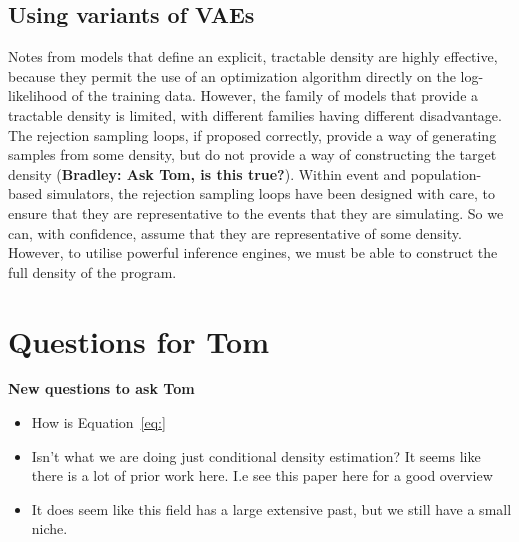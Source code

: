 \documentclass{article}
\begin{document}
\subsection{Using variants of VAEs}

Notes from models that define an explicit,  
tractable density are highly effective, 
because they permit the use of an optimization algorithm directly on the log-likelihood of the training data.
However,  the  family  of  models  that provide  a  tractable  density  is  limited,
with  different  families  having  different disadvantage.
The rejection sampling loops, if proposed correctly, provide a way of generating 
samples from some density, but do not provide a way of constructing the target density (\textbf{Bradley: Ask Tom, is this true?}). 
Within event and population-based simulators, the rejection sampling loops have been designed with care,
to ensure that they are representative to the events that they are simulating. So we can, with confidence,
assume that they are representative of some density. 
However, to utilise powerful inference engines, we must be able to construct the 
full density of the program. 




\section{ Questions for Tom}

\textbf{New questions to ask Tom}

\begin{itemize}
  \item How is Equation~\ref{eq:}
  \item Isn't what we are doing just conditional density estimation? It seems
  like there is a lot of prior work here. I.e see this paper here for a good overview ~\cite{greenberg2019automatic}
  \item It does seem like this field has a large extensive past, but we still have a small niche.
\end{itemize}
\end{document}
